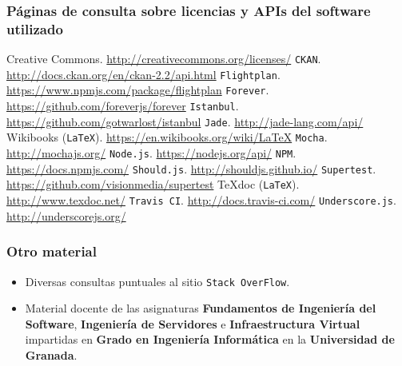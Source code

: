 \subsubsection*{Páginas de consulta sobre licencias y APIs del software utilizado}
 Creative Commons. \url{http://creativecommons.org/licenses/}
 {\tt CKAN}. \url{http://docs.ckan.org/en/ckan-2.2/api.html}
 {\tt Flightplan}. \url{https://www.npmjs.com/package/flightplan}
 {\tt Forever}. \url{https://github.com/foreverjs/forever}
 {\tt Istanbul}. \url{https://github.com/gotwarlost/istanbul}
 {\tt Jade}. \url{http://jade-lang.com/api/}
 Wikibooks ({\tt LaTeX}). \url{https://en.wikibooks.org/wiki/LaTeX}
 {\tt Mocha}. \url{http://mochajs.org/}
 {\tt Node.js}. \url{https://nodejs.org/api/}
 {\tt NPM}. \url{https://docs.npmjs.com/}
 {\tt Should.js}. \url{http://shouldjs.github.io/}
 {\tt Supertest}. \url{https://github.com/visionmedia/supertest}
 TeXdoc ({\tt LaTeX}). \url{http://www.texdoc.net/}
 {\tt Travis CI}. \url{http://docs.travis-ci.com/}
 {\tt Underscore.js}. \url{http://underscorejs.org/}

\bigskip
\subsubsection*{Otro material}
\begin{itemize}
	\item Diversas consultas puntuales al sitio {\tt Stack OverFlow}.
	\item Material docente de las asignaturas \textbf{Fundamentos de Ingeniería del Software}, \textbf{Ingeniería de Servidores} e \textbf{Infraestructura Virtual} impartidas en \textbf{Grado en Ingeniería Informática} en la \textbf{Universidad de Granada}.
\end{itemize}